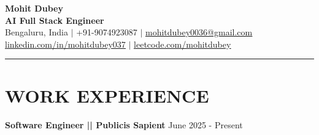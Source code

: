 \documentclass[100pt,a4paper]{article}
\newcommand{\sectionline}{
\begin{center}
\vspace{-10pt}
\rule{1\textwidth}{0.5pt}
\end{center}
\vspace{1pt}
}
\begin{document}
\begin{center}
    {\Huge\bfseries Mohit Dubey} \\ \vspace{4pt}
    \textbf{AI Full Stack Engineer } \\ \vspace{6pt}
    \small Bengaluru, India $|$ +91-9074923087 $|$ \href{mailto:mohitdubey0036@gmail.com}{\underline{mohitdubey0036@gmail.com}} \\
    \href{https://www.linkedin.com/in/mohit-dubey-037/}{\underline{linkedin.com/in/mohitdubey037}} $|$ \href{https://leetcode.com/u/mohitdubey037/}
    {\underline{leetcode.com/mohitdubey}}
\end{center}

\sectionline
\section*{WORK EXPERIENCE}
\textbf{Software Engineer || Publicis Sapient}
\hfill June 2025 - Present
\end{document}
